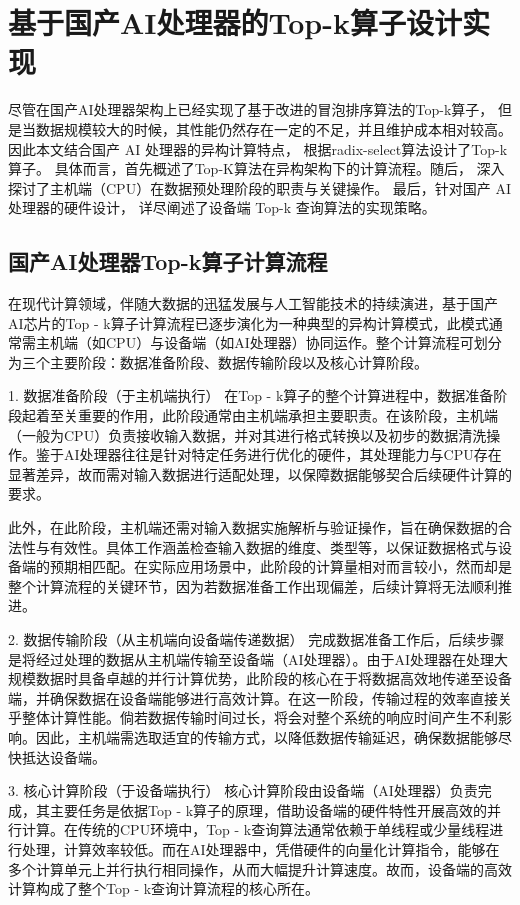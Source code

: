 \chapter{基于国产AI处理器的Top-k算子设计实现}
尽管在国产AI处理器架构上已经实现了基于改进的冒泡排序算法的Top-k算子，
但是当数据规模较大的时候，其性能仍然存在一定的不足，并且维护成本相对较高。
因此本文结合国产 AI 处理器的异构计算特点，
根据radix-select算法设计了Top-k算子。
具体而言，首先概述了Top-K算法在异构架构下的计算流程。随后，
深入探讨了主机端（CPU）在数据预处理阶段的职责与关键操作。
最后，针对国产 AI 处理器的硬件设计，
详尽阐述了设备端 Top-k 查询算法的实现策略。


\section{国产AI处理器Top-k算子计算流程}
在现代计算领域，伴随大数据的迅猛发展与人工智能技术的持续演进，基于国产AI芯片的Top - k算子计算流程已逐步演化为一种典型的异构计算模式，此模式通常需主机端（如CPU）与设备端（如AI处理器）协同运作。整个计算流程可划分为三个主要阶段：数据准备阶段、数据传输阶段以及核心计算阶段。

1. 数据准备阶段（于主机端执行）
在Top - k算子的整个计算进程中，数据准备阶段起着至关重要的作用，此阶段通常由主机端承担主要职责。在该阶段，主机端（一般为CPU）负责接收输入数据，并对其进行格式转换以及初步的数据清洗操作。鉴于AI处理器往往是针对特定任务进行优化的硬件，其处理能力与CPU存在显著差异，故而需对输入数据进行适配处理，以保障数据能够契合后续硬件计算的要求。

此外，在此阶段，主机端还需对输入数据实施解析与验证操作，旨在确保数据的合法性与有效性。具体工作涵盖检查输入数据的维度、类型等，以保证数据格式与设备端的预期相匹配。在实际应用场景中，此阶段的计算量相对而言较小，然而却是整个计算流程的关键环节，因为若数据准备工作出现偏差，后续计算将无法顺利推进。

2. 数据传输阶段（从主机端向设备端传递数据）
完成数据准备工作后，后续步骤是将经过处理的数据从主机端传输至设备端（AI处理器）。由于AI处理器在处理大规模数据时具备卓越的并行计算优势，此阶段的核心在于将数据高效地传递至设备端，并确保数据在设备端能够进行高效计算。在这一阶段，传输过程的效率直接关乎整体计算性能。倘若数据传输时间过长，将会对整个系统的响应时间产生不利影响。因此，主机端需选取适宜的传输方式，以降低数据传输延迟，确保数据能够尽快抵达设备端。

3. 核心计算阶段（于设备端执行）
核心计算阶段由设备端（AI处理器）负责完成，其主要任务是依据Top - k算子的原理，借助设备端的硬件特性开展高效的并行计算。在传统的CPU环境中，Top - k查询算法通常依赖于单线程或少量线程进行处理，计算效率较低。而在AI处理器中，凭借硬件的向量化计算指令，能够在多个计算单元上并行执行相同操作，从而大幅提升计算速度。故而，设备端的高效计算构成了整个Top - k查询计算流程的核心所在。

